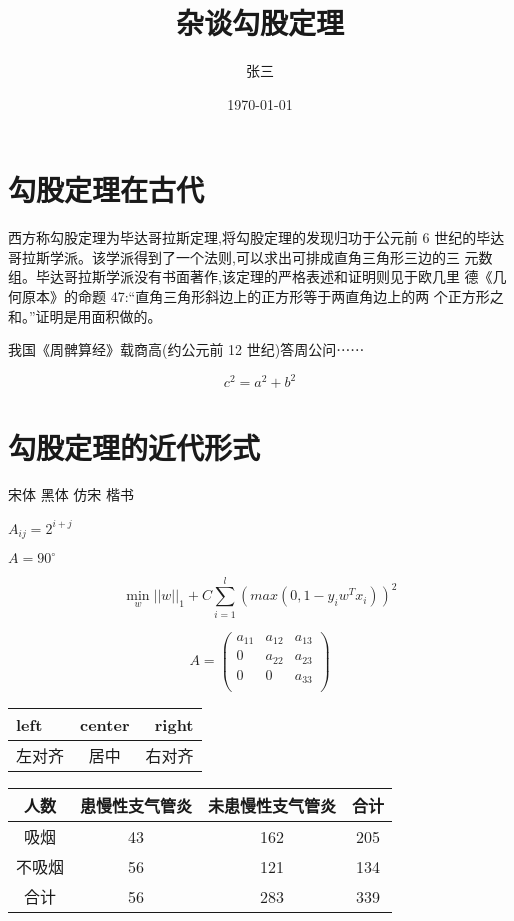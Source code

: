 \documentclass[UTF8]{ctexart}
\title{\heiti 杂谈勾股定理}
\author{\kaishu 张三}
\date{\today}
\begin{document}
\maketitle 

\tableofcontents 

\newpage
\section{勾股定理在古代}

西方称勾股定理为毕达哥拉斯定理,将勾股定理的发现归功于公元前 6 世纪的毕达哥拉斯学派。该学派得到了一个法则,可以求出可排成直角三角形三边的三 元数组。毕达哥拉斯学派没有书面著作,该定理的严格表述和证明则见于欧几里 德《几何原本》的命题 47:“直角三角形斜边上的正方形等于两直角边上的两
个正方形之和。”证明是用面积做的。 

我国《周髀算经》载商高(约公元前 12 世纪)答周公问⋯⋯

$$c^2 = a^2 + b^2$$
\newpage
\section{勾股定理的近代形式} 
{\songti 宋体} {\heiti 黑体} {\fangsong 仿宋} {\kaishu 楷书} 

\newpage


\newpage
{}

$A_{ij}=2^{i+j}$

$A=90^\circ$

\[
\min_w   {||w||_{1} + C\sum_{i=1}^l (max(0, 1 - y_{i}w^{T}x_{i}))^{2}}
\]

\[
A = \begin{pmatrix}
a_{11} & a_{12} & a_{13} \\
0 & a_{22} & a_{23} \\
0 & 0 & a_{33} \\
\end{pmatrix}
\]



\begin{tabular}{|l|c|r|}
\hline
left & center & right \\
\hline
左对齐 &居中 & 右对齐 \\
\hline
\end{tabular}



\begin{tabular}{|c|cc|c|}
\hline
人数 & 患慢性支气管炎 & 未患慢性支气管炎 & 合计 \\
\hline
吸烟 &43 & 162 & 205 \\
不吸烟 & 56 & 121 & 134 \\
\hline
合计 & 56 & 283 & 339 \\
\hline
\end{tabular}
\end{document}
